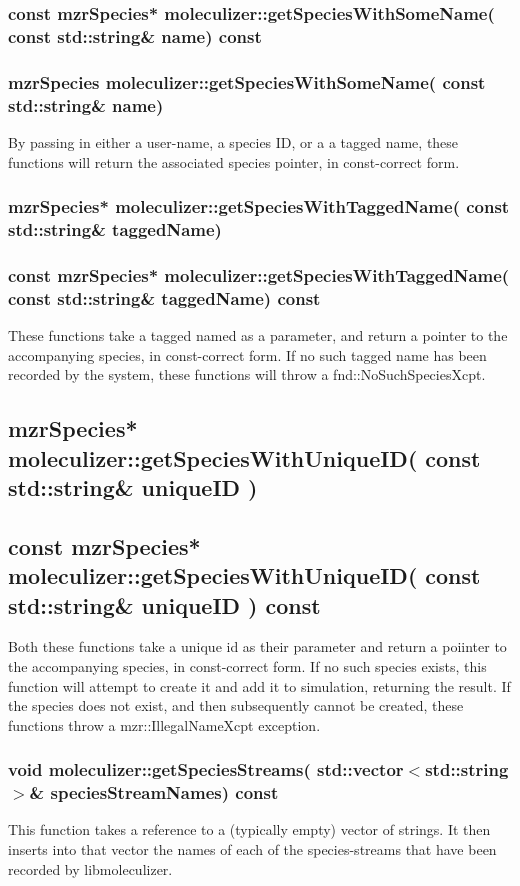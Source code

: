 \subsubsection{const mzrSpecies* moleculizer::getSpeciesWithSomeName(
  const std::string\& name) const }
\subsubsection{mzrSpecies moleculizer::getSpeciesWithSomeName(
  const std::string\& name) }
By passing in either a user-name, a species ID, or a a tagged name,
these functions will return the associated species pointer, in
const-correct form.  

\subsubsection{mzrSpecies* moleculizer::getSpeciesWithTaggedName( const
  std::string\& taggedName) }
\subsubsection{const mzrSpecies* moleculizer::getSpeciesWithTaggedName( const
  std::string\& taggedName) const }
These functions take a tagged named as a parameter, and return a
pointer to the accompanying species, in const-correct form.  If no
such tagged name has been recorded by the system, these functions will
throw a fnd::NoSuchSpeciesXcpt. 


\subsection{mzrSpecies* moleculizer::getSpeciesWithUniqueID( const
  std::string\& uniqueID
  )}
\subsection{const mzrSpecies* moleculizer::getSpeciesWithUniqueID(
  const std::string\& uniqueID ) const}
Both these functions take a unique id as their parameter and return a
poiinter to the accompanying species, in const-correct form.  If no
such species exists, this function will attempt to create it and add
it to simulation, returning the result.  If the species does not
exist, and then subsequently cannot be created, these functions throw
a mzr::IllegalNameXcpt exception.

\subsubsection{void moleculizer::getSpeciesStreams( std::vector$<$std::string$>$\&
  speciesStreamNames) const}
This function takes a reference to a (typically empty) vector of
strings.  It then inserts into that vector the names of each of the
species-streams that have been recorded by libmoleculizer.

